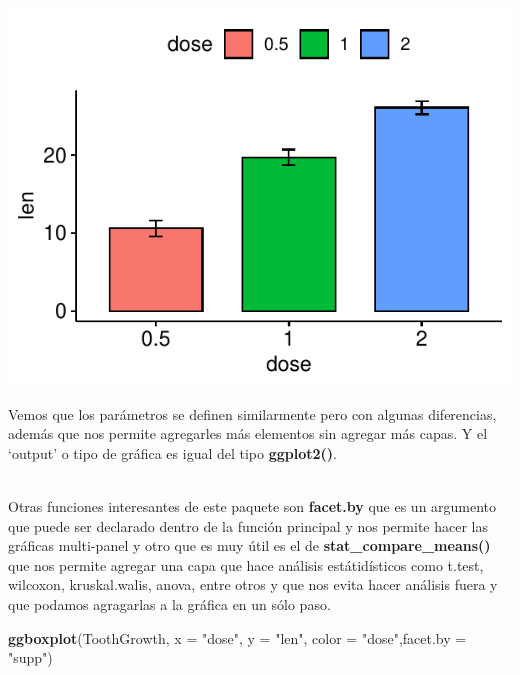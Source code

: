 \documentclass[
]{book}
\newenvironment{Shaded}{\begin{snugshade}}{\end{snugshade}}
\newcommand{\AttributeTok}[1]{\textcolor[rgb]{0.13,0.29,0.53}{#1}}
\newcommand{\FunctionTok}[1]{\textcolor[rgb]{0.13,0.29,0.53}{\textbf{#1}}}
\newcommand{\NormalTok}[1]{#1}
\newcommand{\StringTok}[1]{\textcolor[rgb]{0.31,0.60,0.02}{#1}}
\begin{document}
\begin{center}\includegraphics{_main_files/figure-latex/unnamed-chunk-227-1} \end{center}

\hfill\break
Vemos que los parámetros se definen similarmente pero con algunas diferencias, además que nos permite agregarles más elementos sin agregar más capas.
Y el `output' o tipo de gráfica es igual del tipo \textbf{ggplot2()}.\\
\strut \\

Otras funciones interesantes de este paquete son \textbf{facet.by} que es un argumento que puede ser declarado dentro de la función principal y nos permite hacer las gráficas multi-panel y otro que es muy útil es el de \textbf{stat\_compare\_means()} que nos permite agregar una capa que hace análisis estátidísticos como t.test, wilcoxon, kruskal.walis, anova, entre otros y que nos evita hacer análisis fuera y que podamos agragarlas a la gráfica en un sólo paso.\\

\begin{Shaded}
\begin{Highlighting}[]
\FunctionTok{ggboxplot}\NormalTok{(ToothGrowth, }\AttributeTok{x =} \StringTok{"dose"}\NormalTok{, }\AttributeTok{y =} \StringTok{"len"}\NormalTok{, }\AttributeTok{color =} \StringTok{"dose"}\NormalTok{,}\AttributeTok{facet.by =} \StringTok{"supp"}\NormalTok{)}
\end{Highlighting}
\end{Shaded}
\end{document}
